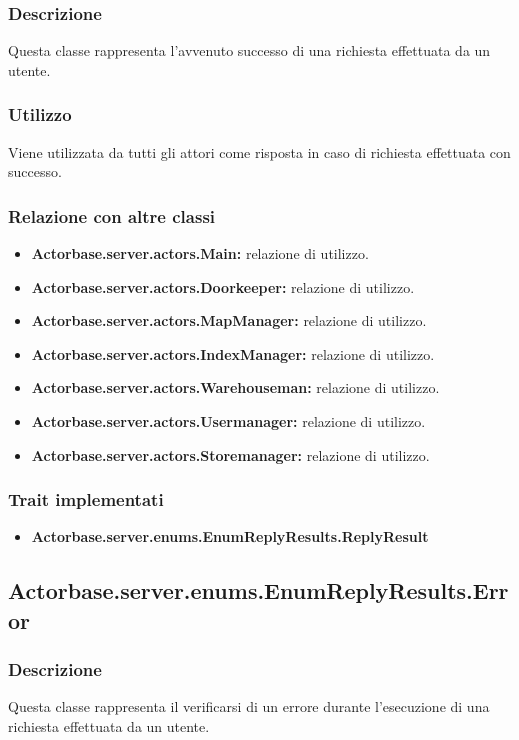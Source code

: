 \documentclass[a4paper]{article}
\begin{document}
			\subsubsection{Descrizione}
				Questa classe rappresenta l'avvenuto successo di una richiesta effettuata da un utente.
				
			\subsubsection{Utilizzo}
				Viene utilizzata da tutti gli attori come risposta in caso di richiesta effettuata con successo.
				
			\subsubsection{Relazione con altre classi}
				\begin{itemize}
					\item \textbf{Actorbase.server.actors.Main:} relazione di utilizzo.
					\item \textbf{Actorbase.server.actors.Doorkeeper:} relazione di utilizzo.
					\item \textbf{Actorbase.server.actors.MapManager:} relazione di utilizzo.
					\item \textbf{Actorbase.server.actors.IndexManager:} relazione di utilizzo.
					\item \textbf{Actorbase.server.actors.Warehouseman:} relazione di utilizzo.
					\item \textbf{Actorbase.server.actors.Usermanager:} relazione di utilizzo.
					\item \textbf{Actorbase.server.actors.Storemanager:} relazione di utilizzo.
				\end{itemize}
		
			\subsubsection{Trait implementati}
				\begin{itemize}
					\item \textbf{Actorbase.server.enums.EnumReplyResults.ReplyResult} 
				\end{itemize}
				
		\subsection{Actorbase.server.enums.EnumReplyResults.Error}
			\subsubsection{Descrizione}
				Questa classe rappresenta il verificarsi di un errore durante l'esecuzione di una richiesta effettuata da un utente.
				
\end{document}
